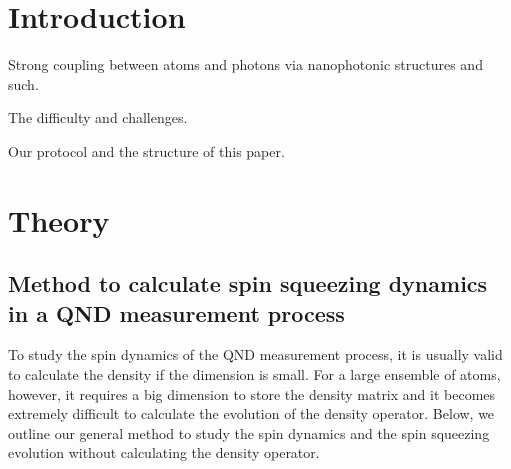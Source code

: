 \documentclass[pra,twocolumn,floatfix,superscriptaddress]{revtex4-1} %
\begin{document}
\section{Introduction}

Strong coupling between atoms and photons via nanophotonic structures and such.

The difficulty and challenges.

Our protocol and the structure of this paper.


\section{Theory} \label{Sec::Theory}

\subsection{Method to calculate spin squeezing dynamics in a QND measurement process}
To study the spin dynamics of the QND measurement process, it is usually valid to calculate the density if the dimension is small. 
For a large ensemble of atoms, however, it requires a big dimension to store the density matrix and it becomes extremely difficult to calculate the evolution of the density operator.
Below, we outline our general method to study the spin dynamics and the spin squeezing evolution without calculating the density operator.
\end{document}
